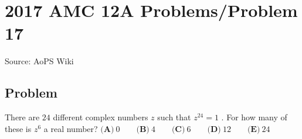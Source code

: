 \documentclass[12pt]{article}
\begin{document}
\section*{{2017 AMC 12A Problems/Problem 17}}
Source: AoPS Wiki

\subsection*{Problem}
There are $24$ different complex numbers $z$ such that $z^{24}=1$ . For how many of these is $z^6$ a real number? $\textbf{(A)}\ 0 \qquad\textbf{(B)}\ 4 \qquad\textbf{(C)}\ 6 \qquad\textbf{(D)}\ 12 \qquad\textbf{(E)}\ 24$
\end{document}
